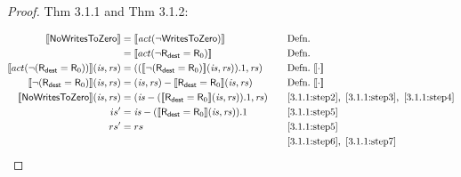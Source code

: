\documentclass[12pt, letterpaper]{article}
\newcommand\interp[1]{\llbracket #1 \rrbracket}
\begin{document}
\begin{proof}
 Thm 3.1.1 and Thm 3.1.2:
 \par\nobreak
 {\fontsize{10pt}{12pt}\selectfont
   \begin{alignat}{2}
     \setcounter{equation}{0}
     \label{3.1.1:step1}
     \interp{\mathsf{NoWritesToZero}}
     &= \interp{\mathit{act}(\neg \mathsf{WritesToZero})}
     &&\quad \text{Defn.}\\
     \label{3.1.1:step2}
     &= \interp{act(\neg \mathsf{R}_{\mathsf{dest}} = \mathsf{R}_0)}
     &&\quad \text{Defn.}\\
     \label{3.1.1:step3}
     \interp{act(\neg(\mathsf{R}_{\mathsf{dest}} = \mathsf{R}_0))}(\mathit{is},\mathit{rs})
     &= ((\interp{\neg(\mathsf{R}_{\mathsf{dest}} = \mathsf{R}_0)}(\mathit{is},\mathit{rs})).1, \mathit{rs})
     &&\quad \text{Defn.}\ \interp{\cdot}\\    
     \label{3.1.1:step4}
     \interp{\neg(\mathsf{R}_{\mathsf{dest}} = \mathsf{R}_0)}(\mathit{is},\mathit{rs})
     &= (\mathit{is},\mathit{rs}) - \interp{\mathsf{R}_{\mathsf{dest}} = \mathsf{R}_0}(\mathit{is},\mathit{rs})
     &&\quad \text{Defn.}\ \interp{\cdot}\\    
     \label{3.1.1:step5}
     \interp{\mathsf{NoWritesToZero}}(\mathit{is},\mathit{rs})
     &= (\mathit{is} - (\interp{\mathsf{R}_{\mathsf{dest}} = \mathsf{R}_0}(\mathit{is},\mathit{rs})).1, \mathit{rs})
     &&\quad \ref{3.1.1:step2},\ \ref{3.1.1:step3},\ \ref{3.1.1:step4}\\
     \label{3.1.1:step6}
     is' &= \mathit{is} - (\interp{\mathsf{R}_{\mathsf{dest}} = \mathsf{R}_0}(\mathit{is},\mathit{rs})).1
     &&\quad \ref{3.1.1:step5} \\
     \label{3.1.1:step7}
     rs' &= rs 
     &&\quad \ref{3.1.1:step5} \\
     \label{3.1.1:qed}
     &\qedhere
    &&\quad \ref{3.1.1:step6},\ \ref{3.1.1:step7}
   \end{alignat}
 }%
 \end{proof}
 
\end{document}
